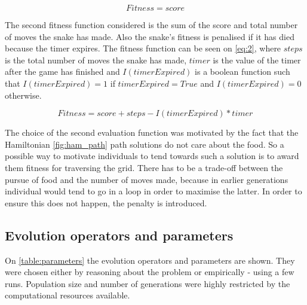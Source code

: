 \documentclass[12pt,a4paper]{article}
\begin{document}
	\begin{equation} \label{eq:1}
		Fitness = score
	\end{equation}
	
	The second fitness function considered is the sum of the score and total number of moves the snake has made. Also the snake's fitness is penalised if it has died because the timer expires. The fitness function can be seen on \autoref{eq:2}, where $steps$ is the total number of moves the snake has made, $timer$ is the value of the timer after the game has finished and $I(timerExpired)$ is a boolean function such that $I(timerExpired) = 1$ if $timerExpired=True$ and $I(timerExpired)=0$ otherwise.
	
	\begin{equation} \label{eq:2}
		Fitness = score + steps - I(timerExpired) * timer
	\end{equation}
	
	The choice of the second evaluation function was motivated by the fact that the Hamiltonian \autoref{fig:ham_path} path solutions do not care about the food. So a possible way to motivate individuals to tend towards such a solution is to award them fitness for traversing the grid. There has to be a trade-off between the pursue of food and the number of moves made, because in earlier generations individual would tend to go in a loop in order to maximise the latter. In order to ensure this does not happen, the penalty is introduced.
	
	\subsection{Evolution operators and parameters}
	On \autoref{table:parameters} the evolution operators and parameters are shown. They were chosen either by reasoning about the problem or empirically - using a few runs. Population size and number of generations were highly restricted by the computational resources available.  
\end{document}
